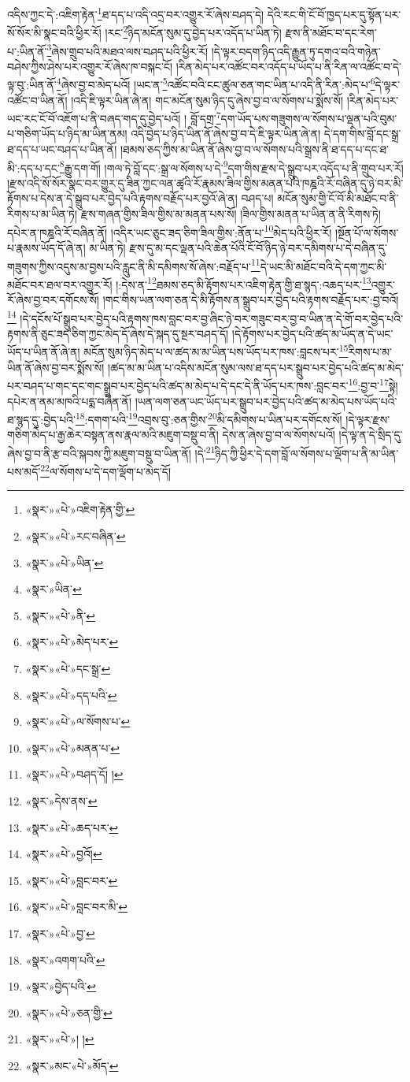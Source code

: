 འདིས་ཀྱང་དེ་:འཇིག་རྟེན་\footnote{«སྣར་»«པེ་»འཇིག་རྟེན་གྱི་}ཐ་དད་པ་འདི་འདྲ་བར་འགྱུར་རོ་ཞེས་བཤད་དེ། དེའི་རང་གི་ངོ་བོ་ཁྱད་པར་དུ་སྟོན་པར་སོ་སོར་མི་སྣང་བའི་ཕྱིར་རོ། །རང་\footnote{«སྣར་»«པེ་»རང་བཞིན་}ཉིད་མངོན་སུམ་དུ་བྱེད་པར་འདོད་པ་ཡིན་ཏེ། རྫས་ནི་མཐོང་བ་དང་རེག་པ་:ཡིན་ནོ་\footnote{«སྣར་»«པེ་»ཡིན་}ཞེས་གྲུབ་པའི་མཐའ་ལས་བཤད་པའི་ཕྱིར་རོ། །དེ་ལྟར་བདག་ཉིད་འདི་རྒྱུན་ཏུ་དགའ་བའི་གཉེན་བཤེས་ཀྱིས་ཤེས་པར་འགྱུར་རོ་ཞེས་ཁ་བསྐང་ངོ། །རིན་མེད་པར་འཚོང་བར་འདོད་པ་ཡོད་པ་ནི་རིན་ལ་འཚོང་བ་དེ་ལྟ་བུ་:ཡིན་ནོ་\footnote{«སྣར་»ཡིན་}ཞེས་བྱ་བ་མེད་པའོ། །ཡང་ན་\footnote{«སྣར་»«པེ་»ནི་}འཚོང་བའི་ངང་ཚུལ་ཅན་གང་ཡིན་པ་འདི་ནི་རིན་:མེད་པ་\footnote{«སྣར་»«པེ་»མེད་པར་}དེ་ལྟར་འཚོང་བ་ཡིན་ནོ། །འདི་ཇི་ལྟར་ཡིན་ཞེ་ན། གང་མངོན་སུམ་ཉིད་དུ་ཞེས་བྱ་བ་ལ་སོགས་པ་སྨོས་སོ། །རིན་མེད་པར་ཡང་རང་ངོ་བོ་འཇོག་པ་ནི་བཞད་གད་དུ་བྱེད་པའོ། །
བློ་དགྲ་\footnote{«སྣར་»«པེ་»དང་སྒྲ་}དག་ཡོད་པས་གཟུགས་ལ་སོགས་པ་ལྡན་པའི་བུམ་པ་གཅིག་ཡོད་པ་ཉིད་མ་ཡིན་ནམ། འདི་བྱེད་པ་ཉིད་ཡིན་ནོ་ཞེས་བྱ་བ་དེ་ཇི་ལྟར་ཡིན་ཞེ་ན། དེ་དག་གིས་བློ་དང་སྒྲ་ཐ་དད་པ་ཡང་བཤད་པ་ཡིན་ནོ། །ཐམས་ཅད་ཀྱིས་མ་ཡིན་ནོ་ཞེས་བྱ་བ་ལ་སོགས་པའི་སྒྲས་ནི་ཐ་དད་པ་དང་ཐ་མི་:དད་པ་དང་\footnote{«སྣར་»«པེ་»དད་པའི་}རྒྱུ་དག་གོ། །གལ་ཏེ་བློ་དང་:སྒྲ་ལ་སོགས་པ་དེ་\footnote{«སྣར་»«པེ་»ལ་སོགས་པ་}དག་གིས་རྫས་དེ་སྒྲུབ་པར་འདོད་པ་ནི་གྲུབ་པར་རོ། །རྫས་འདི་སོ་སོར་སྣང་བར་གྱུར་དུ་ཟིན་ཀྱང་ལན་ཚྭའི་རོ་རྣམས་ཟིལ་གྱིས་མནན་པའི་ཁཎྜའི་རོ་བཞིན་དུ་ཉེ་བར་མི་རྟོགས་པ་དེས་ན་དེ་སྒྲུབ་པར་བྱེད་པའི་རྟགས་བརྗོད་པར་བྱའོ་ཞེ་ན། བཤད་པ། མངོན་སུམ་གྱི་ངོ་བོ་མི་མཐོང་བ་ནི་རིགས་པ་མ་ཡིན་ཏེ། རྫས་གཞན་གྱིས་ཟིལ་གྱིས་མ་མནན་པས་སོ། །ཟིལ་གྱིས་མནན་པ་ཡིན་ན་ནི་རིགས་ཏེ། དཔེར་ན་ཁཎྜའི་རོ་བཞིན་ནོ། །འདིར་ཡང་ཅུང་ཟད་ཅིག་ཟིལ་གྱིས་:ནོན་པ་\footnote{«སྣར་»«པེ་»མནན་པ་}མེད་པའི་ཕྱིར་རོ། །སྔོན་པོ་ལ་སོགས་པ་རྣམས་ཡོད་དོ་ཞེ་ན། མ་ཡིན་ཏེ། རྫས་དུ་མ་དང་ལྡན་པའི་ཆེན་པོའི་ངོ་བོ་ཉིད་ཉེ་བར་དམིགས་པ་དེ་བཞིན་དུ་གཟུགས་ཀྱིས་འདུས་མ་བྱས་པའི་རླུང་ནི་མི་དམིགས་སོ་ཞེས་:བརྗོད་པ་\footnote{«སྣར་»«པེ་»བཤད་དོ། །}དེ་ཡང་མི་མཐོང་བའི་དེ་དག་ཀྱང་མི་མཐོང་བར་ཐལ་བར་འགྱུར་རོ། །:དེས་ན་\footnote{«སྣར་»དེས་ནས་}ཐམས་ཅད་མི་རྟོགས་པར་འཇིག་རྟེན་གྱི་ཐ་སྙད་:འཆད་པར་\footnote{«སྣར་»«པེ་»ཆད་པར་}འགྱུར་རོ་ཞེས་བྱ་བར་དགོངས་སོ། །གང་གིས་ཡན་ལག་ཅན་དེ་མི་རྟོགས་ན་སྒྲུབ་པར་བྱེད་པའི་རྟགས་བརྗོད་པར་:བྱ་བའོ།\footnote{«སྣར་»«པེ་»བྱའོ།} །དེ་དངོས་པོ་སྒྲུབ་པར་བྱེད་པའི་རྟགས་ཁས་བླང་བར་བྱ་ཞིང་ཉེ་བར་གཟུང་བར་བྱ་བ་ཡིན་ན་དེ་གོ་བར་བྱེད་པའི་རྟགས་ནི་ཅུང་ཟད་ཅིག་ཀྱང་མེད་དོ་ཞེས་དེ་སྐད་དུ་སྔར་བཤད་དོ། །དེ་རྟོགས་པར་བྱེད་པའི་ཚད་མ་ཡོད་ན་དེ་ཡང་ཡོད་པ་ཡིན་ནོ་ཞེ་ན། མངོན་སུམ་ཉིད་མེད་པ་ལ་ཚད་མ་མ་ཡིན་པས་ཡོད་པར་ཁས་:བླངས་པར་\footnote{«སྣར་»«པེ་»བླང་བར་}རིགས་པ་མ་ཡིན་ནོ་ཞེས་བྱ་བར་སྨོས་སོ། །ཚད་མ་མ་ཡིན་པ་འདིས་མངོན་སུམ་ལས་ཐ་དད་པར་སྒྲུབ་པར་བྱེད་པའི་ཚད་མ་མེད་པར་བཤད་པ་གང་དང་གང་སྒྲུབ་པར་བྱེད་པའི་ཚད་མ་མེད་པ་དེ་དང་དེ་ནི་ཡོད་པར་ཁས་:བླང་བར་\footnote{«སྣར་»«པེ་»བླང་བར་མི་}:བྱ་བ་\footnote{«སྣར་»«པེ་»བྱ་}སྟེ། དཔེར་ན་ནམ་མཁའི་པདྨ་བཞིན་ནོ། །ཡན་ལག་ཅན་ཡང་ཡོད་པར་སྒྲུབ་པར་བྱེད་པའི་ཚད་མ་མེད་པས་ཡོད་པའི་ཐ་སྙད་དུ་:བྱེད་པའི་\footnote{«སྣར་»འགག་པའི་}:དགག་པའི་\footnote{«སྣར་»བྱེད་པའི་}འབྲས་བུ་:ཅན་གྱིས་\footnote{«སྣར་»«པེ་»ཅན་གྱི་}མི་དམིགས་པ་ཡིན་པར་དགོངས་སོ། །དེ་ལྟར་རྫས་གཅིག་མེད་པ་རྒྱ་ཆེར་བསྟན་ནས་རྣལ་མའི་མཇུག་བསྡུ་བ་ནི། དེས་ན་ཞེས་བྱ་བ་ལ་སོགས་པའོ། །དེ་ལྟ་ན་དེ་སྲིད་དུ་ཞེས་བྱ་བ་ནི་རྩ་བའི་སྐབས་ཀྱི་མཇུག་བསྡུ་བ་ཡིན་ནོ། །དེ་\footnote{«སྣར་»«པེ་»། །}ཉིད་ཀྱི་ཕྱིར་དེ་དག་བློ་ལ་སོགས་པ་ལྡོག་པ་ནི་མ་ཡིན་པས་མདོ་\footnote{«སྣར་»མང་«པེ་»མོད་}ལ་སོགས་པ་དེ་དག་ལྡོག་པ་མེད་དོ། 